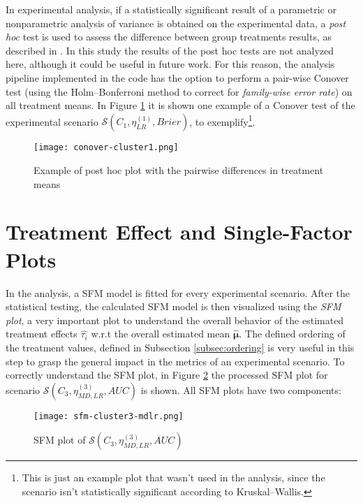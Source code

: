 In experimental analysis, if a statistically significant result of a parametric or nonparametric analysis of variance is obtained on the experimental data, a \textit{post hoc} test is used to assess the difference between group treatments results, as described in \cite{Terpilowski2019}. In this study the results of the post hoc tests are not analyzed here, although it could be useful in future work. For this reason, the analysis pipeline implemented in the code has the option to perform a pair-wise Conover test (using the Holm–Bonferroni method to correct for \textit{family-wise error rate}) on all treatment means. In Figure \ref{fig:posthoc-conover} it is shown one example of a Conover test of the experimental scenario $\mathcal{S}(C_1, \eta^{(1)}_{LR}, Brier)$, to exemplify\footnote{This is just an example plot that wasn't used in the analysis, since the scenario isn't statistically significant according to Kruskal–Wallis.}.

\begin{figure}[H]
    \centering
    \texttt{[image: conover-cluster1.png]} 
    \caption{Example of post hoc plot with the pairwise differences in treatment means}
    \label{fig:posthoc-conover}
\end{figure}

\section{Treatment Effect and Single-Factor Plots}

In the analysis, a SFM model is fitted for every experimental scenario. After the statistical testing, the calculated SFM model is then visualized using the \textit{SFM plot}, a very important plot to understand the overall behavior of the estimated treatment effects $\hat{\tau_i}$ w.r.t the overall estimated mean $\hat{\bm{\mu}}$. The defined ordering of the treatment values, defined in Subsection \ref{subsec:ordering} is very useful in this step to grasp the general impact in the metrics of an experimental scenario. To correctly understand the SFM plot, in Figure \ref{fig:sfm-plot-c3-mdlr} the processed SFM plot for scenario $\mathcal{S}(C_3, \eta^{(3)}_{MD, LR}, AUC)$ is shown. All SFM plots have two components:

\begin{figure}[H]
    \centering
    \texttt{[image: sfm-cluster3-mdlr.png]} 
    \caption{SFM plot of  $\mathcal{S}(C_3, \eta^{(3)}_{MD, LR}, AUC)$}
    \label{fig:sfm-plot-c3-mdlr}
\end{figure}


